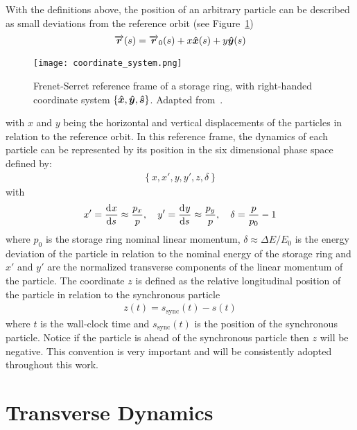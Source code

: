     With the definitions above, the position of an arbitrary particle can be described as small deviations from the reference orbit (see Figure~\ref{fig:reference_frame})
    \begin{align}
        \overrightarrow{\boldsymbol{r}}(s) = \overrightarrow{\boldsymbol{r}}_0(s) + x\boldsymbol{\hat x}(s) + y\boldsymbol{\hat y}(s)
    \end{align}
    \begin{figure}
        \centering
        \texttt{[image: coordinate\_system.png]}
        \caption[Frenet-Serret reference frame of a storage ring]{Frenet-Serret reference frame of a storage ring, with right-handed coordinate system $\{ \boldsymbol{\hat x}, \boldsymbol{\hat y}, \boldsymbol{\hat s} \}$. Adapted from~\cite[pp. 123]{Lee1999}.}
        \label{fig:reference_frame}
    \end{figure}
    with $x$ and $y$ being the horizontal and vertical displacements of the particles in relation to the reference orbit. In this reference frame, the dynamics of each particle can be represented by its position in the six dimensional phase space defined by:
    \begin{align}\label{eq:phase_space_definition}
        \left\{ x, x', y, y', z, \delta \right\}
    \end{align}
    with
    \begin{align}
        x' = \frac{\mathrm{d}^{{}}x}{\mathrm{d} s^{{}}} \approx \frac{p_x}{p},\quad
        y' = \frac{\mathrm{d}^{{}}y}{\mathrm{d} s^{{}}} \approx \frac{p_y}{p},\quad
        \delta = \frac{p}{p_0}-1
    \end{align}
    where $p_0$ is the storage ring nominal linear momentum, $\delta \approx \Delta E/E_0$ is the energy deviation of the particle in relation to the nominal energy of the storage ring and $x'$ and $y'$ are the normalized transverse components of the linear momentum of the particle. The coordinate $z$ is defined as the relative longitudinal position of the particle in relation to the synchronous particle
    \begin{align}\label{eq:longitudinal_deviations}
        z(t) = s_\text{sync}(t) - s(t)
    \end{align}
    where $t$ is the wall-clock time and $s_\text{sync}(t)$ is the position of the synchronous particle. Notice if the particle is ahead of the synchronous particle then $z$ will be negative. This convention is very important and will be consistently adopted throughout this work.

\section{Transverse Dynamics}

